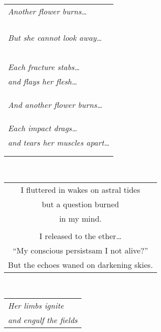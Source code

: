 \documentclass{article}
\begin{document}
\begin{center}
\begin{tabular}{l}
\textit{Another flower burns\ldots} \\
\\
\\
\\
\\
\textit{But she cannot look away\ldots} \\
\\
\\
\\
\\
\\
\textit{Each fracture stabs\ldots} \\
\textit{and flays her flesh\ldots} \\
\\
\\
\\
\textit{And another flower burns\ldots} \\
\\
\\
\\
\textit{Each impact drags\ldots} \\
\textit{and tears her muscles apart\ldots} \\
\\
\\
\end{tabular} \\
\begin{tabular}{c}
\\
I fluttered in wakes on astral tides \\
but a question burned \\
in my mind. \\
\\
I released to the ether\ldots{} \\
``My conscious persists\hspace{3ex}am I not alive?'' \\
But the echoes waned on darkening skies. \\
\end{tabular} \\
\begin{tabular}{l}
\\
\textit{Her limbs ignite}\\
\textit{and engulf the fields}\\

\end{tabular}
\end{center}
\end{document}
